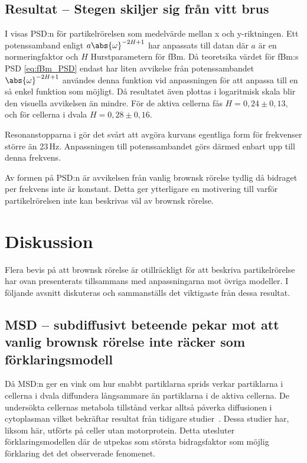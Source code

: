 


\subsection{Resultat -- Stegen skiljer sig från vitt brus}

I  visas PSD:n för partikelrörelsen som medelvärde mellan x och y-riktningen. Ett potenssamband enligt $a\abs{\omega}^{-2H+1}$ har anpassats till datan där $a$ är en normeringfaktor och $H$ Hurstparametern för fBm. Då teoretsika värdet för fBm:s PSD \eqref{eq:fBm_PSD} endast har liten avvikelse från potenssambandet $\abs{\omega}^{-2H+1}$ användes denna funktion vid anpassningen för att anpassa till en så enkel funktion som möjligt. Då resultatet även plottas i logaritmisk skala blir den visuella avvikelsen än mindre. För de aktiva cellerna fås $H=0,24\pm0,13$, och för cellerna i dvala $H=0,28\pm0,16$.

Resonanstopparna i  gör det svårt att avgöra kurvans egentliga form för frekvenser större än 23\,Hz. Anpassningen till potenssambandet görs därmed enbart upp till denna frekvens.

Av formen på PSD:n är avvikelsen från vanlig brownsk rörelse tydlig då bidraget per frekvens inte är konstant. Detta ger ytterligare en motivering till varför partikelrörelsen inte kan beskrivas väl av brownsk rörelse.




\section{Diskussion}

Flera bevis på att brownsk rörelse är otillräckligt för att beskriva partikelrörelse har ovan presenterats tillsammans med anpassningarna mot övriga modeller. I följande avsnitt diskuteras och sammanställs det viktigaste från dessa resultat.

\subsection{MSD -- subdiffusivt beteende pekar mot att vanlig brownsk rörelse inte räcker som förklaringsmodell}
Då MSD:n ger en vink om hur snabbt partiklarna sprids verkar partiklarna i cellerna i dvala diffundera långsammare än partiklarna i de aktiva cellerna. De undersökta cellernas metabola tillstånd verkar alltså påverka diffusionen i cytoplasman vilket bekräftar resultat från tidigare studier~\cite{Parry_etal2014}. Dessa studier har, liksom här, utförts på celler utan motorprotein. Detta utesluter förklaringsmodellen där de utpekas som största bidragsfaktor som möjlig förklaring det det observerade fenomenet. 


